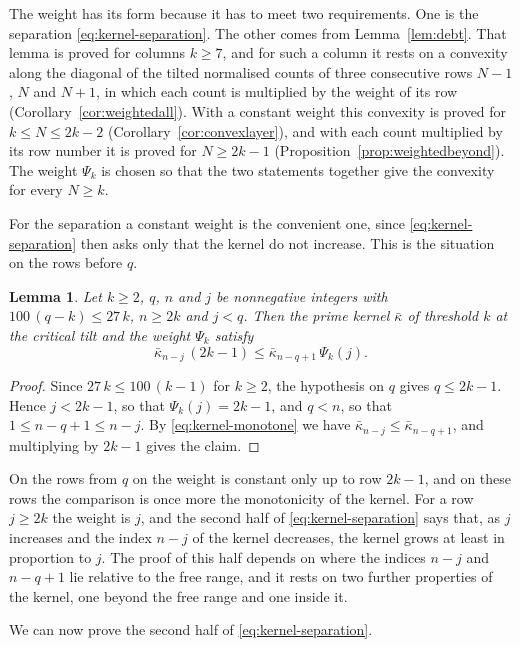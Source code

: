\documentclass{amsart}
\newtheorem{lemma}[theorem]{Lemma}
\theoremstyle{definition}
\theoremstyle{remark}
\numberwithin{equation}{section}
\begin{document}
The weight has its form because it has to meet two requirements. One is
the separation \eqref{eq:kernel-separation}. The other comes from
Lemma~\ref{lem:debt}. That lemma is proved for columns $k\ge7$, and for such
a column it rests on a convexity along the diagonal of the tilted
normalised counts of three consecutive rows $N-1$, $N$ and $N+1$, in which
each count is multiplied by the weight of its row
(Corollary~\ref{cor:weightedall}).
With a constant weight this convexity is proved for $k\le N\le2k-2$
(Corollary~\ref{cor:convexlayer}), and with each count multiplied by its row
number it is proved for $N\ge2k-1$ (Proposition~\ref{prop:weightedbeyond}).
The weight $\Psi_k$ is chosen so that the two statements together give the
convexity for every $N\ge k$.

For the separation a constant weight is the convenient one, since
\eqref{eq:kernel-separation} then asks only that the kernel do not increase.
This is the situation on the rows before $q$.

\begin{lemma}\label{lem:orderbefore}
Let $k\ge2$, $q$, $n$ and $j$ be nonnegative integers with
$100\,(q-k)\le27\,k$, $n\ge2k$ and $j<q$. Then the prime kernel
$\bar\kappa$ of threshold $k$ at the critical tilt and the weight $\Psi_k$
satisfy
\[
\bar\kappa_{n-j}\,(2k-1)\le\bar\kappa_{n-q+1}\,\Psi_k(j) .
\]
\end{lemma}

\begin{proof}
Since $27\,k\le100\,(k-1)$ for $k\ge2$, the hypothesis on $q$ gives
$q\le2k-1$. Hence $j<2k-1$, so that $\Psi_k(j)=2k-1$, and $q<n$, so that
$1\le n-q+1\le n-j$. By \eqref{eq:kernel-monotone} we have
$\bar\kappa_{n-j}\le\bar\kappa_{n-q+1}$, and multiplying by $2k-1$ gives
the claim.
\end{proof}

On the rows from $q$ on the weight is constant only up to row $2k-1$,
and on these rows the comparison is once more the monotonicity of the
kernel. For a row $j\ge2k$ the weight is $j$, and the second half of
\eqref{eq:kernel-separation} says that, as $j$ increases and the index
$n-j$ of the kernel decreases, the kernel grows at least in proportion to
$j$. The proof of this half depends on where the indices $n-j$ and $n-q+1$ lie
relative to the free range, and it rests on two further properties of the
kernel, one beyond the free range and one inside it.

We can now prove the second half of \eqref{eq:kernel-separation}.
\end{document}
